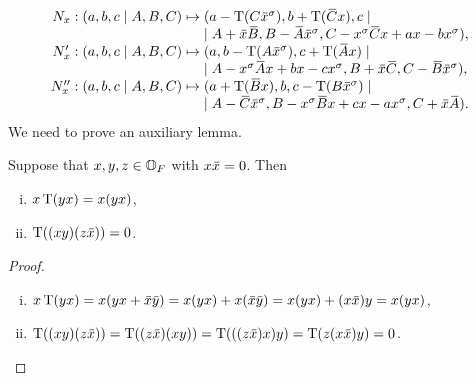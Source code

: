 \begin{equation}
	\label{eq:3_nx_image}
	\begin{array}{r@{\;}c@{\;}l}
		N_x: (a,b,c\mid A,B,C) & \mapsto &
		(a-\Tr(C\ovx ^{\s}), b+\Tr(\ovC x), c \mid \\
		& & \mid	A+\ovx \ovB , B-\ovA \ovx ^{\s},C-x^{\s}\ovC x+ax-bx^{\s}), \\
		
		N_x': (a,b,c\mid A,B,C) & \mapsto & 
		(a, b-\Tr(A \ovx^{\s}), c+\Tr(\ovA x) \mid \\
		& & \mid	A - x^{\s} \ovA x + bx-cx^{\s}, B + \ovx \ovC, C - \ovB \ovx^{\s}), \\
		
		N_x'': (a,b,c\mid A,B,C) & \mapsto &
		(a+\Tr(\ovB x), b, c-\Tr(B\ovx^{\s}) \mid \\
		& & \mid 	A-\ovC\ovx^{\s}, B-x^{\s}\ovB x + cx - ax^{\s}, C+\ovx\ovA).
	\end{array}
\end{equation}
We need to prove an auxiliary lemma.

\begin{lemma}
	\label{lemma:3_oct_aux}
	Suppose that $x,y,z \in \mathbb{O}_F$ with $x \mathord{\mbox{\hspace*{0pt}}\,\overline{\!x\!\!\;}\!\:}\mbox{\hspace*{0pt}}  = 0$. Then
		\begin{enumerate}[(i)]
			\item $x\operatorname{T}(yx) = x(yx)$,
			\item $\operatorname{T}( (xy)(z\mathord{\mbox{\hspace*{0pt}}\,\overline{\!x\!\!\;}\!\:}\mbox{\hspace*{0pt}} ) ) = 0$.		
		\end{enumerate}
\end{lemma}

\begin{proof}
	\leavevmode
	\begin{enumerate}[(i)]
	
	\item $x\Tr(yx) = x (yx + \ovx \ovy ) = x(yx) + x(\ovx \ovy )
		 = x(yx) + (x\ovx )y = x(yx)$,
		 
	\item $\Tr( (xy)(z\ovx ) ) = \Tr( (z\ovx ) (xy) ) = \Tr( ((z\ovx )x) y ) = 
		\Tr(z(x\ovx )y) = 0$. \qedhere
	\end{enumerate}
\end{proof}

